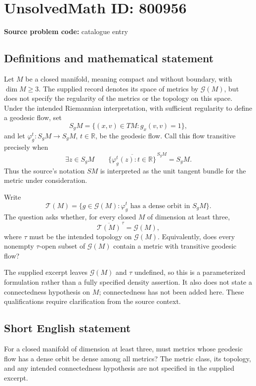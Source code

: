 \documentclass[11pt]{article}
\newcommand{\R}{\mathbb{R}}
\begin{document}
\section*{UnsolvedMath ID: 800956}
\textbf{Source problem code:} catalogue entry
\subsection{Definitions and mathematical statement}
Let \(M\) be a closed manifold, meaning compact and without boundary, with \(\dim M\geq 3\). The supplied record denotes its space of metrics by \(\mathcal{G}(M)\), but does not specify the regularity of the metrics or the topology on this space. Under the intended Riemannian interpretation, with sufficient regularity to define a geodesic flow, set
\[
S_gM=\{(x,v)\in TM:g_x(v,v)=1\},
\]
and let \(\varphi_g^t:S_gM\to S_gM\), \(t\in\R\), be the geodesic flow. Call this flow transitive precisely when
\[
\exists z\in S_gM\qquad
\overline{\{\varphi_g^t(z):t\in\R\}}^{\,S_gM}=S_gM.
\]
Thus the source's notation \(SM\) is interpreted as the unit tangent bundle for the metric under consideration.

Write
\[
\mathcal{T}(M)=\{g\in\mathcal{G}(M):\varphi_g^t\text{ has a dense orbit in }S_gM\}.
\]
The question asks whether, for every closed \(M\) of dimension at least three,
\[
\overline{\mathcal{T}(M)}^{\,\tau}=\mathcal{G}(M),
\]
where \(\tau\) must be the intended topology on \(\mathcal{G}(M)\). Equivalently, does every nonempty \(\tau\)-open subset of \(\mathcal{G}(M)\) contain a metric with transitive geodesic flow?

The supplied excerpt leaves \(\mathcal{G}(M)\) and \(\tau\) undefined, so this is a parameterized formulation rather than a fully specified density assertion. It also does not state a connectedness hypothesis on \(M\); connectedness has not been added here. These qualifications require clarification from the source context.
\subsection{Short English statement}
For a closed manifold of dimension at least three, must metrics whose geodesic flow has a dense orbit be dense among all metrics? The metric class, its topology, and any intended connectedness hypothesis are not specified in the supplied excerpt.
\end{document}
